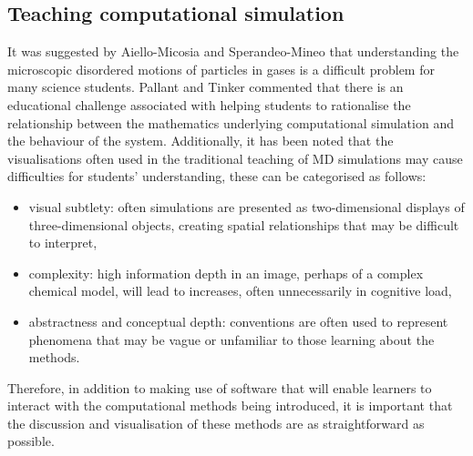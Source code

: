 \subsection{Teaching computational simulation}
It was suggested by Aiello-Micosia and Sperandeo-Mineo that understanding the microscopic disordered motions of particles in gases is a difficult problem for many science students.
Pallant and Tinker commented that there is an educational challenge associated with helping students to rationalise the relationship between the mathematics underlying computational simulation and the behaviour of the system.
Additionally, it has been noted that the visualisations often used in the traditional teaching of MD simulations may cause difficulties for students' understanding, these can be categorised as follows:
\begin{itemize}
\item visual subtlety: often simulations are presented as two-dimensional displays of three-dimensional objects, creating spatial relationships that may be difficult to interpret,
\item complexity: high information depth in an image, perhaps of a complex chemical model, will lead to increases, often unnecessarily in cognitive load,
\item abstractness and conceptual depth: conventions are often used to represent phenomena that may be vague or unfamiliar to those learning about the methods.
\end{itemize}
Therefore, in addition to making use of software that will enable learners to interact with the computational methods being introduced, it is important that the discussion and visualisation of these methods are as straightforward as possible.

